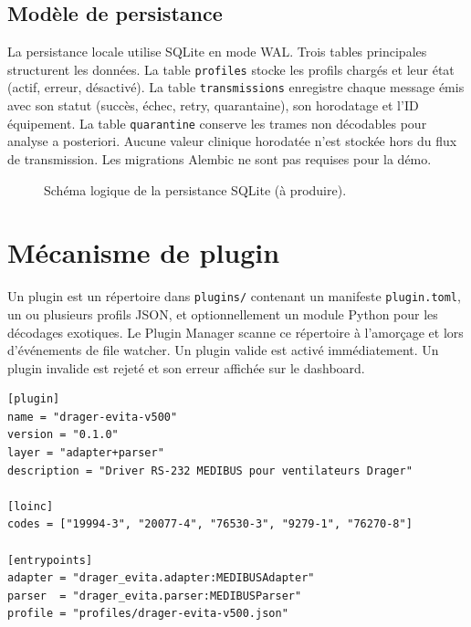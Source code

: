 \subsection{Modèle de persistance}

La persistance locale utilise SQLite en mode WAL. Trois tables principales structurent les données. La table \texttt{profiles} stocke les profils chargés et leur état (actif, erreur, désactivé). La table \texttt{transmissions} enregistre chaque message émis avec son statut (succès, échec, retry, quarantaine), son horodatage et l'ID équipement. La table \texttt{quarantine} conserve les trames non décodables pour analyse a posteriori. Aucune valeur clinique horodatée n'est stockée hors du flux de transmission. Les migrations Alembic ne sont pas requises pour la démo.

\begin{figure}[h]
  \centering
  \caption{Schéma logique de la persistance SQLite (à produire).}
  \label{fig:archi-modele-persistance}
\end{figure}

\section{Mécanisme de plugin}
\label{sec:archi-plugins}

Un plugin est un répertoire dans \texttt{plugins/} contenant un manifeste \texttt{plugin.toml}, un ou plusieurs profils JSON, et optionnellement un module Python pour les décodages exotiques. Le Plugin Manager scanne ce répertoire à l'amorçage et lors d'événements de file watcher. Un plugin valide est activé immédiatement. Un plugin invalide est rejeté et son erreur affichée sur le dashboard.

\begin{lstlisting}[style=bridgebase, language={}, caption={Manifeste plugin.toml minimal.}, label={lst:plugin-toml}]
[plugin]
name = "drager-evita-v500"
version = "0.1.0"
layer = "adapter+parser"
description = "Driver RS-232 MEDIBUS pour ventilateurs Drager"

[loinc]
codes = ["19994-3", "20077-4", "76530-3", "9279-1", "76270-8"]

[entrypoints]
adapter = "drager_evita.adapter:MEDIBUSAdapter"
parser  = "drager_evita.parser:MEDIBUSParser"
profile = "profiles/drager-evita-v500.json"
\end{lstlisting}

